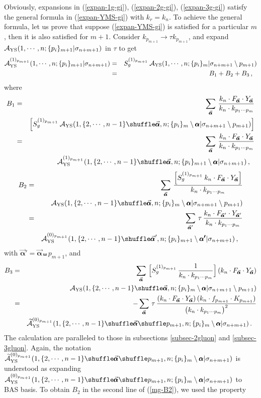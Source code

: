 \documentclass[preprint,showpacs,onecolumn,nofootinbib]{revtex4}
\newcommand{\bea}{\begin{eqnarray}}
\newcommand{\eea}{\end{eqnarray}}
\newcommand{\nn}{\nonumber \\}
\def\W #1{\widetilde{#1}}
\def\eref#1{(\ref{#1})}
\def\a{{\alpha}}
\begin{document}
Obviously, expansions in \eref{expan-1g-gi}, \eref{expan-2g-gi}, \eref{expan-3g-gi} satisfy the general formula in \eref{expan-YMS-gi} with $k_r=k_n$. To achieve the general formula, let us prove that suppose \eref{expan-YMS-gi} is satisfied for a particular $m$, then it is also satisfied for $m+1$. Consider $k_{p_{m+1}}\to\tau k_{p_{m+1}}$, and expand ${\cal A}_{\rm YS}(1,\cdots,n;\{p_i\}_{m+1}|\sigma_{n+m+1})$ in $\tau$ to get
%
\bea
{\cal A}^{(1)_{p_{m+1}}}_{\rm YS}(1,\cdots,n;\{p_i\}_{m+1}|\sigma_{n+m+1})
&=&S^{(1)_{p_{m+1}}}_g\,{\cal A}_{\rm YS}(1,\cdots,n;\{p_i\}_m|\sigma_{n+m+1}\setminus p_{m+1})\nn
&=&B_1+B_2+B_3\,,~~\label{3B}
\eea
%
where
%
\bea
B_1&=&\sum_{\vec{\pmb{\a}}}\,{k_n\cdot F_{\vec{\pmb{\a}}}\cdot Y_{\vec{\pmb{\a}}}\over k_n\cdot k_{p_1\cdots p_m}}\nn
& &\Big[S^{(1)_{p_{m+1}}}_g\,{\cal A}_{\rm YS}(1,\{2,\cdots,n-1\}\shuffle\vec{\pmb{\a}},n;\{p_i\}_m\setminus\pmb{\a}|\sigma_{n+m+1}\setminus p_{m+1})\Big]\nn
&=&\sum_{\vec{\pmb{\a}}}\,{k_n\cdot F_{\vec{\pmb{\a}}}\cdot Y_{\vec{\pmb{\a}}}\over k_n\cdot k_{p_1\cdots p_m}}\nn
& &{\cal A}^{(1)_{p_{m+1}}}_{\rm YS}(1,\{2,\cdots,n-1\}\shuffle\vec{\pmb{\a}},n;\{p_i\}_{m+1}\setminus\pmb{\a}|\sigma_{n+m+1})\,,~~\label{mg-B1}
\eea
%
%
\bea
B_2
&=&\sum_{\vec{\pmb{\a}}}\,{\Big[S^{(1)_{p_{m+1}}}_g\,k_n\cdot F_{\vec{\pmb{\a}}}\cdot Y_{\vec{\pmb{\a}}}\Big]\over k_n\cdot k_{p_1\cdots p_m}}\nn
& &{\cal A}_{\rm YS}(1,\{2,\cdots,n-1\}\shuffle\vec{\pmb{\a}},n;\{p_i\}_m\setminus\pmb{\a}|\sigma_{n+m+1}\setminus p_{m+1})\nn
&=&\sum_{\vec{\pmb{\a}}'}\,\tau\,{k_n\cdot F_{\vec{\pmb{\a}}'}\cdot Y_{\vec{\pmb{\a}}'}\over k_n\cdot k_{p_1\cdots p_m}}\nn
& &{\cal A}^{(0)_{p_{m+1}}}_{\rm YS}(1,\{2,\cdots,n-1\}\shuffle\vec{\pmb{\a}}',n;\{p_i\}_{m+1}\setminus\pmb{\a'}|\sigma_{n+m+1})\,,~~\label{mg-B2}
\eea
%
with $\vec{\pmb{\a}}'=\vec{\pmb{\a}}\shuffle p_{m+1}$, and
%
\bea
B_3
&=&\sum_{\vec{\pmb{\a}}}\,\Big[S^{(1)_{p_{m+1}}}_g\,{1\over k_n\cdot k_{p_1\cdots p_m}}\Big]\,(k_n\cdot F_{\vec{\pmb{\a}}}\cdot Y_{\vec{\pmb{\a}}})\nn
& &{\cal A}_{\rm YS}(1,\{2,\cdots,n-1\}\shuffle\vec{\pmb{\a}},n;\{p_i\}_m\setminus\pmb{\a}|\sigma_{n+m+1}\setminus p_{m+1})\nn
&=&-\sum_{\vec{\pmb{\a}}}\,\tau\,{(k_n\cdot F_{\vec{\pmb{\a}}}\cdot Y_{\vec{\pmb{\a}}})\,(k_n\cdot f_{p_{m+1}}\cdot K_{p_{m+1}})\over \big(k_n\cdot k_{p_1\cdots p_m}\big)^2}\nn
& &\W{\cal A}^{(0)_{p_{m+1}}}_{\rm YS}(1,\{2,\cdots,n-1\}\shuffle\vec{\pmb{\a}}\shuffle p_{m+1},n;\{p_i\}_m\setminus\pmb{\a}|\sigma_{n+m+1})\,.~~\label{mg-B3}
\eea
%
The calculation are paralleled to those in subsections \ref{subsec-2gluon} and \ref{subsec-3gluon}. Again, the notation $\W{\cal A}^{(0)_{p_{m+1}}}_{\rm YS}(1,\{2,\cdots,n-1\}\shuffle\vec{\pmb{\a}}\shuffle p_{m+1},n;\{p_i\}_m\setminus\pmb{\a}|\sigma_{n+m+1})$ is understood as expanding ${\cal A}^{(0)_{p_{m+1}}}_{\rm YS}(1,\{2,\cdots,n-1\}\shuffle\vec{\pmb{\a}}\shuffle p_{m+1},n;\{p_i\}_m\setminus\pmb{\a}|\sigma_{n+m+1})$ to BAS basis. To obtain $B_2$ in the second line of \eref{mg-B2}, we used the property
\end{document}
